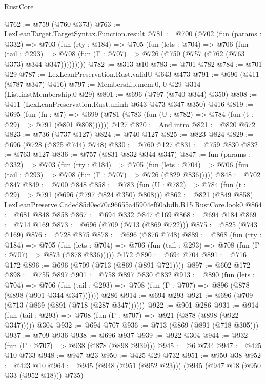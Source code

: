 \begin{lexlean}{RustCore}
\begin{coremodule}
@762 := @759 (@760 @373)
@763 := LexLeanTarget.TargetSyntax.Function.result
@781 := @700
    (@702
      (fun (params : @332) =>
      @703
        (fun (rty : @184) =>
        @705
          (fun (lets : @704) =>
          @706
            (fun (tail : @293) =>
            @708 (fun (Γ : @707) => @726 (@750 (@757 (@762 (@763 @373) @344 @347)))))))))
@782 := @313 @10
@783 := @701 @782
@784 := @701 @29
@787 := LexLeanPreservation.Rust.validU @643 @473
@791 := @696 (@411 (@787 @347) @416)
@797 := Membership.mem.{0, 0} @29 @314 (List.instMembership.{0} @29)
@801 := @696 (@797 (@740 @344) @350)
@808 := @411 (LexLeanPreservation.Rust.uninh @643 @473 @347 @350) @416
@819 := @695
    (fun (fn : @7) =>
    @699 (@781 (@783 (fun (U : @782) => @784 (fun (t : @29) => @791 (@801 @808))))))
    @127
@820 := And.intro
@821 := @820 @672
@823 := @736 (@737 @127)
@824 := @740 @127
@825 := @823 @824
@829 := @696 (@728 (@825 @744) @748)
@830 := @760 @127
@831 := @759 @830
@832 := @763 @127
@836 := @757 (@831 @832 @344 @347)
@847 := fun (params : @332) =>
  @703
    (fun (rty : @184) =>
    @705
      (fun (lets : @704) => @706 (fun (tail : @293) => @708 (fun (Γ : @707) => @726 (@829 @836)))))
@848 := @702 @847
@849 := @700 @848
@858 := @783 (fun (U : @782) => @784 (fun (t : @29) => @791 (@696 (@797 @824 @350) @808)))
@862 := @821 (@849 @858) LexLeanPreserve.Caded85d0ec70c96655a45904ef60abdb.R15.RustCore.look0
@864 := @681 @848 @858
@867 := @694 @332 @847 @169
@868 := @694 @184
@869 := @714 @169
@873 := @696 (@709 (@713 (@869 @722)))
@875 := @825 (@743 @169)
@876 := @728 @875
@878 := @696 (@876 @748)
@889 := @868
    (fun (rty : @184) =>
    @705
      (fun (lets : @704) => @706 (fun (tail : @293) => @708 (fun (Γ : @707) => @873 (@878 @836)))))
    @172
@890 := @694 @704
@891 := @716 @172
@896 := @696 (@709 (@713 (@869 (@891 @721))))
@897 := @602 @172
@898 := @755 @897
@901 := @758 @897 @830 @832
@913 := @890
    (fun (lets : @704) =>
    @706 (fun (tail : @293) => @708 (fun (Γ : @707) => @896 (@878 (@898 (@901 @344 @347))))))
    @286
@914 := @694 @293
@921 := @696 (@709 (@713 (@869 (@891 (@718 (@287 @347))))))
@922 := @901 @286
@931 := @914 (fun (tail : @293) => @708 (fun (Γ : @707) => @921 (@878 (@898 (@922 @347))))) @304
@932 := @694 @707
@936 := @713 (@869 (@891 (@718 @305)))
@937 := @709 @936
@938 := @696 @937
@939 := @922 @304
@944 := @932 (fun (Γ : @707) => @938 (@878 (@898 @939)))
@945 := @6 @734
@947 := @425 @10 @733
@948 := @947 @23
@950 := @425 @29 @732
@951 := @950 @38
@952 := @423 @10
@964 := @945 (@948 (@951 (@952 @23))) (@945 (@947 @18 (@950 @33 (@952 @18))) @735)

\end{coremodule}
\end{lexlean}
